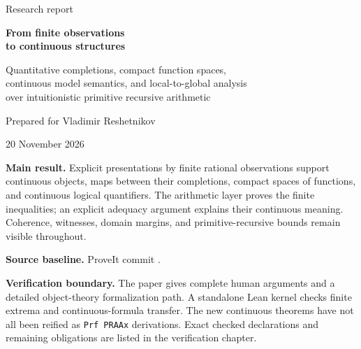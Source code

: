\documentclass[11pt,a4paper]{article}
\numberwithin{equation}{section}
\theoremstyle{definition}
\theoremstyle{remark}\newtheorem{remark}[theorem]{Remark}
\newcommand{\code}[1]{\texttt{#1}}
\begin{document}
\hypersetup{pageanchor=false}
\begin{titlepage}
\color{ink}
{\Large Research report\par}
\vspace{18mm}
{\huge\bfseries From finite observations\\[4pt]to continuous structures\par}
\vspace{7mm}
{\Large Quantitative completions, compact function spaces,\\continuous model semantics, and local-to-global analysis\\over intuitionistic primitive recursive arithmetic\par}
\vspace{13mm}
{\large Prepared for Vladimir Reshetnikov\par}
{\large 20 November 2026\par}
\vspace{12mm}
\begin{minipage}{0.94\textwidth}
\textbf{Main result.} Explicit presentations by finite rational observations support continuous objects, maps between their completions, compact spaces of functions, and continuous logical quantifiers. The arithmetic layer proves the finite inequalities; an explicit adequacy argument explains their continuous meaning. Coherence, witnesses, domain margins, and primitive-recursive bounds remain visible throughout.
\end{minipage}
\vfill
\small
\textbf{Source baseline.} ProveIt commit
.
\par\textbf{Verification boundary.} The paper gives complete human arguments and a detailed object-theory formalization path. A standalone Lean kernel checks finite extrema and continuous-formula transfer. The new continuous theorems have not all been reified as \code{Prf PRAAx} derivations. Exact checked declarations and remaining obligations are listed in the verification chapter.
\end{titlepage}
\hypersetup{pageanchor=true}
\end{document}
